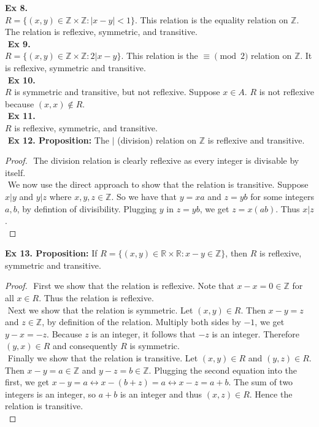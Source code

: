 \documentclass{article}
\begin{document}
\newpage
\noindent\textbf{Ex 8.}\\
$R=\{(x, y) \in \mathbb{Z}\times\mathbb{Z} : |x-y|<1 \}$. This relation is the equality relation on $\mathbb{Z}$. The relation is reflexive, symmetric, and transitive.\\
$ $\newline
\textbf{Ex 9.}\\
$R=\{(x, y) \in \mathbb{Z}\times\mathbb{Z} : 2|x-y \}$. This relation is the $\equiv \pmod{2}$ relation on $\mathbb{Z}$. It is reflexive, symmetric and transitive.\\
$ $\newline
\textbf{Ex 10.}\\
$R$ is symmetric and transitive, but not reflexive. Suppose $x \in A$. $R$ is not reflexive because $(x,x) \not\in R$.\\
$ $\newline
\textbf{Ex 11.}\\
$R$ is reflexive, symmetric, and transitive.\\
$ $\newline
\textbf{Ex 12. Proposition:} The $|$ (division) relation on $\mathbb{Z}$ is reflexive and transitive.
\begin{proof}
$ $\newline
The division relation is clearly reflexive as every integer is divisable by itself.\\
$ $\newline
We now use the direct approach to show that the relation is transitive. Suppose $x|y$ and $y|z$ where $x,y,z \in \mathbb{Z}$. So we have that $y=xa$ and $z=yb$ for some integers $a,b$, by defintion of divisibility. Plugging $y$ in $z=yb$, we get $z=x(ab)$. Thus $x|z$.\\
\end{proof}
\noindent \textbf{Ex 13. Proposition:} If $R=\{(x, y) \in \mathbb{R} \times \mathbb{R} : x - y \in \mathbb{Z}\}$, then $R$ is reflexive, symmetric and transitive.
\begin{proof}
$ $\newline
First we show that the relation is reflexive. Note that $x-x=0 \in \mathbb{Z}$ for all $x \in R$. Thus the relation is reflexive.\\
$ $\newline
Next we show that the relation is symmetric. Let $(x, y) \in R$. Then $x-y=z$ and $z \in \mathbb{Z}$, by definition of the relation. Multiply both sides by $-1$, we get $y-x=-z$. Because $z$ is an integer, it follows that $-z$ is an integer. Therefore $(y,x) \in R$ and consequently $R$ is symmetric.\\
$ $\newline
Finally we show that the relation is transitive. Let $(x, y) \in R$ and $(y, z) \in R$. Then $x-y=a \in \mathbb{Z}$ and $y-z=b \in \mathbb{Z}$. Plugging the second equation into the first, we get $x-y=a \leftrightarrow x - (b+z) = a \leftrightarrow x-z=a+b$. The sum of two integers is an integer, so $a+b$ is an integer and thus $(x, z) \in R$. Hence the relation is transitive.\\
\end{proof}
\end{document}
